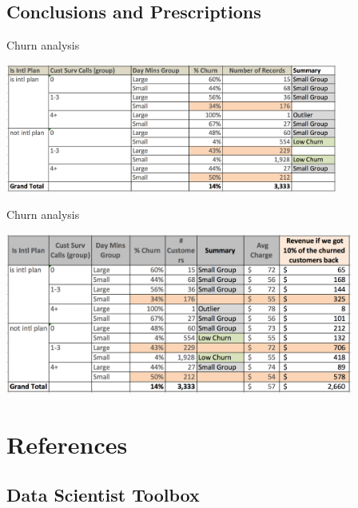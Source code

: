 \documentclass[10pt]{beamer}
\begin{document}
  \subsection{Conclusions and Prescriptions}

    \begin{frame}{Churn analysis}
      \begin{center}
        \includegraphics[height=120pt]{../graphs/churn_analysis}
      \end{center}
    \end{frame}

    \begin{frame}{Churn analysis}
      \begin{center}
        \includegraphics[height=150pt]{../graphs/churn_analysis_revenue}
      \end{center}
    \end{frame}

\section{References}

  \subsection{Data Scientist Toolbox}
\end{document}
